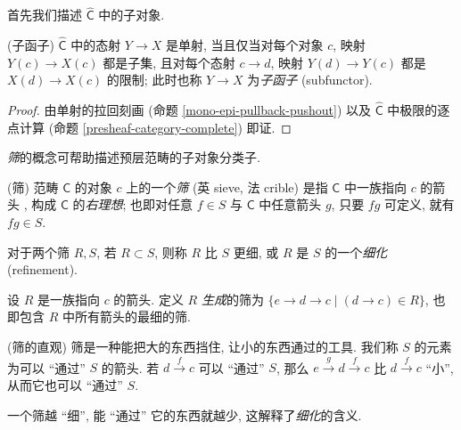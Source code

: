     首先我们描述 $\widehat{\mathsf C}$ 中的子对象.

\begin{propdef}
    [label={subfunctor-description}]
    {(子函子)}
    $\widehat{\mathsf C}$ 中的态射 $Y \to X$ 是单射, 当且仅当对每个对象 $c$, 映射 $Y(c) \to X(c)$ 都是子集,
    且对每个态射 $c\to d$, 映射 $Y(d) \to Y(c)$ 都是 $X(d) \to X(c)$ 的限制; 此时也称 $Y \to X$ 为\emph{子函子} (subfunctor).
\end{propdef}

\begin{proof}
	由单射的拉回刻画 (命题 \ref{mono-epi-pullback-pushout}) 以及 $\widehat {\mathsf C}$ 中极限的逐点计算 (命题 \ref{presheaf-category-complete}) 即证.
\end{proof}

\emph{筛}的概念可帮助描述预层范畴的子对象分类子.

\begin{definition}
	[label={sieve}]
    {(筛)}
    范畴 $\mathsf C$ 的对象 $c$ 上的一个\emph{筛} (英 sieve, 法 crible) 是指 $\mathsf C$ 中一族指向 $c$ 的箭头 , 构成 $\mathsf C$ 的\emph{右理想}; 也即对任意 $f\in S$ 与 $\mathsf C$ 中任意箭头 $g$, 只要 $fg$ 可定义, 就有 $fg \in S$.

    对于两个筛 $R,S$, 若 $R\subset S$, 则称 $R$ 比 $S$ 更细, 或 $R$ 是 $S$ 的一个\emph{细化} (refinement).

    设 $R$ 是一族指向 $c$ 的箭头. 定义 $R$ \emph{生成}的筛为  $\{e\to d\to c\mid (d\to c)\in R \}$, 也即包含 $R$ 中所有箭头的最细的筛.
\end{definition}

\begin{remark}
    {(筛的直观)}
    筛是一种能把大的东西挡住, 让小的东西通过的工具. 我们称 $S$ 的元素为可以 ``通过'' $S$ 的箭头.
    若 $d \overset{f}{\longrightarrow} c$ 可以 ``通过'' $S$, 那么 $e \overset{g}{\longrightarrow} d \overset{f}{\longrightarrow} c$ 比 $d \overset{f}{\longrightarrow} c$ ``小'', 从而它也可以 ``通过'' $S$.

    \begin{center}
        
    \end{center}


    一个筛越 ``细'', 能 ``通过'' 它的东西就越少, 这解释了\emph{细化}的含义.
\end{remark}

